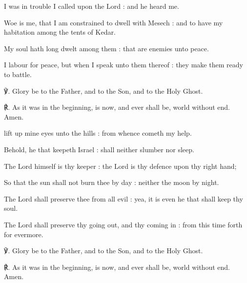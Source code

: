
 I was in trouble I called upon the Lord : and he heard me.\par
{}
Woe is me, that I am constrained to dwell with Mesech : and to have my habitation among the tents of Kedar.\par
{}My soul hath long dwelt among them : that are enemies unto peace.\par
{}I labour for peace, but when I speak unto them thereof : they make them ready to battle.\par
℣. Glory be to the Father, and to the Son, and to the Holy Ghost.\par
℟. As it was in the beginning, is now, and ever shall be, world without end. Amen.


 lift up mine eyes unto the hills : from whence cometh my help.\par
{}
Behold, he that keepeth Israel : shall neither slumber nor sleep.\par
{}The Lord himself is thy keeper : the Lord is thy defence upon thy right hand;\par
{}So that the sun shall not burn thee by day : neither the moon by night.\par
{}The Lord shall preserve thee from all evil : yea, it is even he that shall keep thy soul.\par
{}The Lord shall preserve thy going out, and thy coming in : from this time forth for evermore.\par
℣. Glory be to the Father, and to the Son, and to the Holy Ghost.\par
℟. As it was in the beginning, is now, and ever shall be, world without end. Amen.


